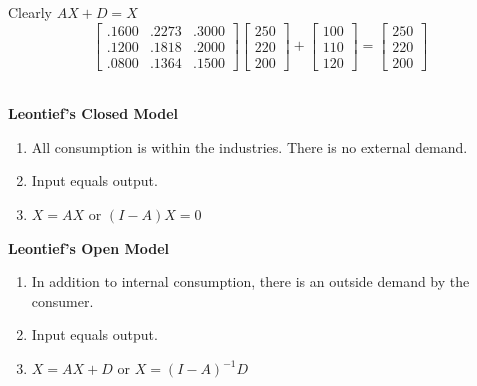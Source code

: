 \begin{solution}
    Clearly \( AX + D = X \)
    \[ \begin{bmatrix}
            .1600 & .2273 & .3000 \\
            .1200 & .1818 & .2000 \\
            .0800 & .1364 & .1500
        \end{bmatrix} \begin{bmatrix}
            250 \\
            220 \\
            200
        \end{bmatrix} + \begin{bmatrix}
            100 \\
            110 \\
            120
        \end{bmatrix} = \begin{bmatrix}
            250 \\
            220 \\
            200
        \end{bmatrix} \]
\end{solution}



\begin{summarybox}
    ~\\
    \textbf{Leontief's Closed Model}
    \begin{enumerate}
        \item All consumption is within the industries. There is no external demand.
        \item Input equals output.
        \item $X = AX$ or $(I - A)X = 0$
    \end{enumerate}

    \textbf{Leontief's Open Model}
    \begin{enumerate}
        \item In addition to internal consumption, there is an outside demand by the consumer.
        \item Input equals output.
        \item $X = AX + D$ or $X = (I - A)^{-1} D$
    \end{enumerate}
\end{summarybox}